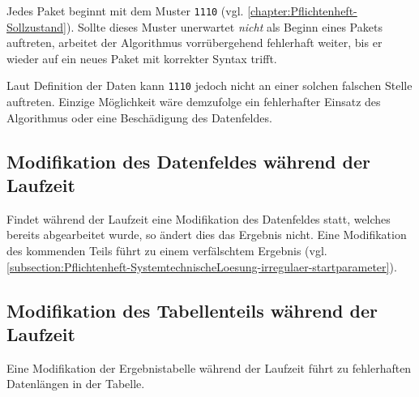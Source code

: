 Jedes Paket beginnt mit dem Muster \texttt{1110} (vgl. \autoref{chapter:Pflichtenheft-Sollzustand}). Sollte dieses Muster unerwartet \emph{nicht} als Beginn eines Pakets auftreten, arbeitet der Algorithmus vorrübergehend fehlerhaft weiter, bis er wieder auf ein neues Paket mit korrekter Syntax trifft.

Laut Definition der Daten kann \texttt{1110} jedoch nicht an einer solchen falschen Stelle auftreten. Einzige Möglichkeit wäre demzufolge ein fehlerhafter Einsatz des Algorithmus oder eine Beschädigung des Datenfeldes.

\subsection{Modifikation des Datenfeldes während der Laufzeit}
\label{subsection:Pflichtenheft-SystemtechnischeLoesung-irregulaer-moddatenfeld}

Findet während der Laufzeit eine Modifikation des Datenfeldes statt, welches bereits abgearbeitet wurde, so ändert dies das Ergebnis nicht. Eine Modifikation des kommenden Teils führt zu einem verfälschtem Ergebnis (vgl. \autoref{subsection:Pflichtenheft-SystemtechnischeLoesung-irregulaer-startparameter}).

\subsection{Modifikation des Tabellenteils während der Laufzeit}
\label{subsection:Pflichtenheft-SystemtechnischeLoesung-irregulaer-modtabelle}

Eine Modifikation der Ergebnistabelle während der Laufzeit führt zu fehlerhaften Datenlängen in der Tabelle.
